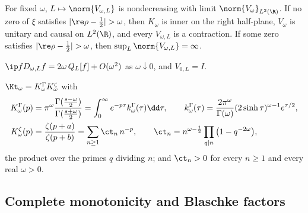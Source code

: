 \begin{proposition}\label{prop:dichotomy}
For fixed $\omega$, $L\mapsto\norm{V_{\omega,L}}$ is nondecreasing with limit
$\norm{V_\omega}_{L^2(\R)}$. If no zero of $\xi$ satisfies
$\lvert\re\rho-\frac12\rvert>\omega$, then $K_\omega$ is inner on the right
half-plane, $V_\omega$ is unitary and causal on $L^2(\R)$, and every
$V_{\omega,L}$ is a contraction. If some zero satisfies
$\lvert\re\rho-\frac12\rvert>\omega$, then $\sup_L\norm{V_{\omega,L}}=\infty$.
\end{proposition}

\begin{proposition}\label{prop:firstorder}
$\ip f{D_{\omega,L}f}=2\omega\,Q_L[f]+O(\omega^2)$ as $\omega\downarrow0$, and
$V_{0,L}=I$.
\end{proposition}

\begin{proposition}\label{prop:pieces}
$\Kt_\omega=K^\Gamma_\omega K^\zeta_\omega$ with
\begin{align}
 K^\Gamma_\omega(p)&=\pi^\omega\frac{\Gamma(\frac{s-\omega}2)}{\Gamma(\frac{s+\omega}2)}
 =\int_0^\infty e^{-p\tau}k^\Gamma_\omega(\tau)\dd\tau,\qquad
 k^\Gamma_\omega(\tau)=\frac{2\pi^\omega}{\Gamma(\omega)}(2\sinh\tau)^{\omega-1}e^{\tau/2},
 \label{eq:kgamma}\\
 K^\zeta_\omega(p)&=\frac{\zeta(p+a)}{\zeta(p+b)}=\sum_{n\ge1}\ct_n\,n^{-p},\qquad
 \ct_n=n^{\omega-\frac12}\prod_{q\mid n}\big(1-q^{-2\omega}\big),
 \label{eq:comb}
\end{align}
the product over the primes $q$ dividing $n$; and $\ct_n>0$ for every $n\ge1$ and
every real $\omega>0$.
\end{proposition}

\subsection{Complete monotonicity and Blaschke factors}\label{sec:cmblaschke}

